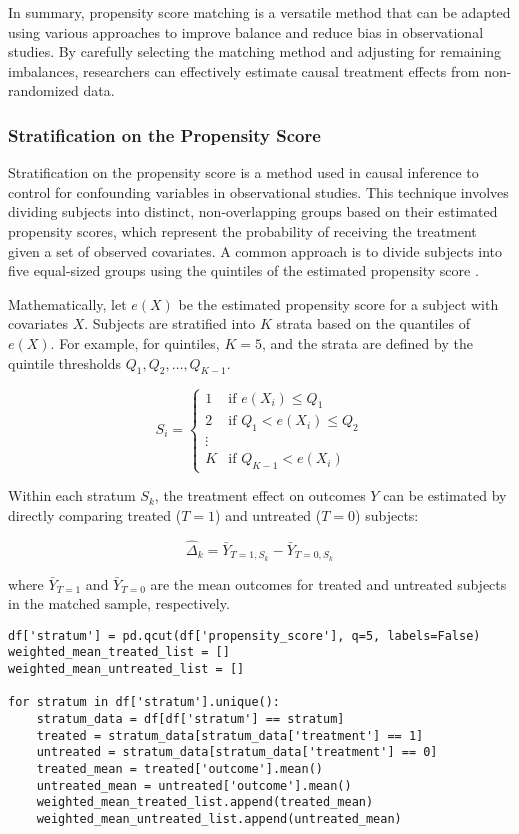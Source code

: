 \documentclass{article}
\begin{document}
In summary, propensity score matching is a versatile method that can be adapted using various approaches to improve balance and reduce bias in observational studies. By carefully selecting the matching method and adjusting for remaining imbalances, researchers can effectively estimate causal treatment effects from non-randomized data.

\subsubsection{Stratification on the Propensity Score}
Stratification on the propensity score is a method used in causal inference to control for confounding variables in observational studies. This technique involves dividing subjects into distinct, non-overlapping groups based on their estimated propensity scores, which represent the probability of receiving the treatment given a set of observed covariates. A common approach is to divide subjects into five equal-sized groups using the quintiles of the estimated propensity score \cite{austin2011introduction}. 

Mathematically, let \(e(X)\) be the estimated propensity score for a subject with covariates \(X\). Subjects are stratified into \(K\) strata based on the quantiles of \(e(X)\). For example, for quintiles, \(K = 5\), and the strata are defined by the quintile thresholds \(Q_1, Q_2, \ldots, Q_{K-1}\).

\[
S_i = \begin{cases} 
1 & \text{if } e(X_i) \leq Q_1 \\
2 & \text{if } Q_1 < e(X_i) \leq Q_2 \\
\vdots & \\
K & \text{if } Q_{K-1} < e(X_i) 
\end{cases}
\]

Within each stratum \(S_k\), the treatment effect on outcomes \(Y\) can be estimated by directly comparing treated (\(T = 1\)) and untreated (\(T = 0\)) subjects:

\[
\hat{\Delta}_k = \bar{Y}_{T=1, S_k} - \bar{Y}_{T=0, S_k}
\]

where \(\bar{Y}_{T=1}\) and \(\bar{Y}_{T=0}\) are the mean outcomes for treated and untreated subjects in the matched sample, respectively. 

\begin{verbatim}
df['stratum'] = pd.qcut(df['propensity_score'], q=5, labels=False)
weighted_mean_treated_list = []
weighted_mean_untreated_list = []

for stratum in df['stratum'].unique():
    stratum_data = df[df['stratum'] == stratum]
    treated = stratum_data[stratum_data['treatment'] == 1]
    untreated = stratum_data[stratum_data['treatment'] == 0]
    treated_mean = treated['outcome'].mean()
    untreated_mean = untreated['outcome'].mean()
    weighted_mean_treated_list.append(treated_mean)
    weighted_mean_untreated_list.append(untreated_mean)
\end{verbatim}
\end{document}
